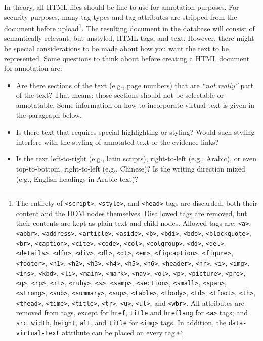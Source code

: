 In theory, all HTML files should be fine to use for annotation purposes.
For security purposes, many tag types and tag attributes are stripped from the document before upload\footnote{%
  The entirety of \texttt{<script>}, \texttt{<style>}, and \texttt{<head>} tags are discarded, both their content and the DOM nodes themselves.
  Disallowed tags are removed, but their contents are kept as plain text and child nodes.
  Allowed tags are:
  \texttt{<a>}, \texttt{<abbr>}, \texttt{<address>}, \texttt{<article>},
  \texttt{<aside>}, \texttt{<b>}, \texttt{<bdi>}, \texttt{<bdo>}, \texttt{<blockquote>},
  \texttt{<br>}, \texttt{<caption>}, \texttt{<cite>}, \texttt{<code>}, \texttt{<col>},
  \texttt{<colgroup>}, \texttt{<dd>}, \texttt{<del>}, \texttt{<details>}, \texttt{<dfn>},
  \texttt{<div>}, \texttt{<dl>}, \texttt{<dt>}, \texttt{<em>}, \texttt{<figcaption>},
  \texttt{<figure>}, \texttt{<footer>}, \texttt{<h1>}, \texttt{<h2>}, \texttt{<h3>},
  \texttt{<h4>}, \texttt{<h5>}, \texttt{<h6>}, \texttt{<header>}, \texttt{<hr>},
  \texttt{<i>}, \texttt{<img>}, \texttt{<ins>}, \texttt{<kbd>}, \texttt{<li>},
  \texttt{<main>}, \texttt{<mark>}, \texttt{<nav>}, \texttt{<ol>}, \texttt{<p>},
  \texttt{<picture>}, \texttt{<pre>}, \texttt{<q>}, \texttt{<rp>}, \texttt{<rt>},
  \texttt{<ruby>}, \texttt{<s>}, \texttt{<samp>}, \texttt{<section>}, \texttt{<small>},
  \texttt{<span>}, \texttt{<strong>}, \texttt{<sub>}, \texttt{<summary>}, \texttt{<sup>},
  \texttt{<table>}, \texttt{<tbody>}, \texttt{<td>}, \texttt{<tfoot>}, \texttt{<th>},
  \texttt{<thead>}, \texttt{<time>}, \texttt{<title>}, \texttt{<tr>}, \texttt{<u>},
  \texttt{<ul>}, and \texttt{<wbr>}.
  All attributes are removed from tags, except for
  \texttt{href}, \texttt{title} and \texttt{hreflang} for \texttt{<a>} tags;
  and \texttt{src}, \texttt{width}, \texttt{height}, \texttt{alt}, and \texttt{title} for \texttt{<img>} tags.
  In addition, the \texttt{data-virtual-text} attribute can be placed on every tag.
}.
The resulting document in the database will consist of semantically relevant, but unstyled, HTML tags, and text.
However, there might be special considerations to be made about how you want the text to be represented.
Some questions to think about before creating a HTML document for annotation are:

\begin{itemize}
  \item
    Are there sections of the text (e.g., page numbers) that are \emph{\enquote{not really}} part of the text?
    That means: those sections should not be selectable or annotatable.
    Some information on how to incorporate virtual text is given in the paragraph below.
  \item
    Is there text that requires special highlighting or styling?
    Would such styling interfere with the styling of annotated text or the evidence links?
  \item
    Is the text left-to-right (e.g., latin scripts), right-to-left (e.g., Arabic), or even top-to-bottom, right-to-left (e.g., Chinese)?
    Is the writing direction mixed (e.g., English headings in Arabic text)?
\end{itemize}

